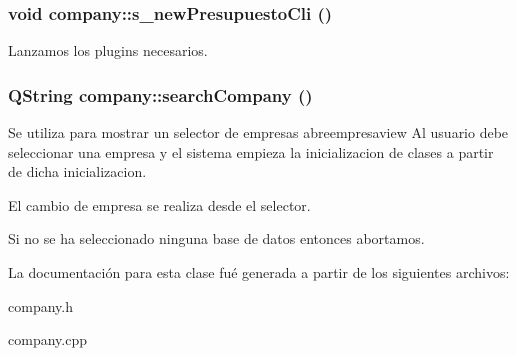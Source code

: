 \subsubsection{\setlength{\rightskip}{0pt plus 5cm}void company::s\_\-new\-Presupuesto\-Cli ()}\label{classcompany_a61}


Lanzamos los plugins necesarios. 
\subsubsection{\setlength{\rightskip}{0pt plus 5cm}QString company::search\-Company ()}\label{classcompany_a68}


Se utiliza para mostrar un selector de empresas abreempresaview Al usuario debe seleccionar una empresa y el sistema empieza la inicializacion de clases a partir de dicha inicializacion.

El cambio de empresa se realiza desde el selector.

Si no se ha seleccionado ninguna base de datos entonces abortamos. 

La documentaci\'{o}n para esta clase fu\'{e} generada a partir de los siguientes archivos:\begin{CompactItemize}
\item 
company.h\item 
company.cpp\end{CompactItemize}

